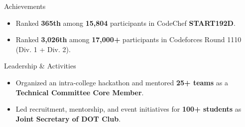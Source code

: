 \documentclass{resume}
\begin{document}

\begin{achievementSection}{Achievements}

    \begin{itemize}
        \itemsep -6pt {}

        \item Ranked \textbf{365th} among \textbf{15,804} participants in CodeChef \textbf{START192D}.

        \item Ranked \textbf{3,026th} among \textbf{17,000+} participants in Codeforces Round 1110 (Div. 1 + Div. 2).

    \end{itemize}

\end{achievementSection}



\begin{experienceSection}{Leadership \& Activities}

    \begin{itemize}
        \itemsep -6pt {}

        \item Organized an intra-college hackathon and mentored \textbf{25+ teams} as a \textbf{Technical Committee Core Member}.

        \item Led recruitment, mentorship, and event initiatives for \textbf{100+ students} as \textbf{Joint Secretary of DOT Club}.

    \end{itemize}

\end{experienceSection}
\end{document}
